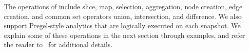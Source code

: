 The operations of \tga include slice, map, selection, aggregation,
node creation, edge creation, and common set operators union,
intersection, and difference.  We also support Pregel-style analytics
that are logically executed on each snapshot.  We explain some of
these operations in the next section through examples, and refer the
reader to~\cite{PortalarXiv2016} for additional details.

